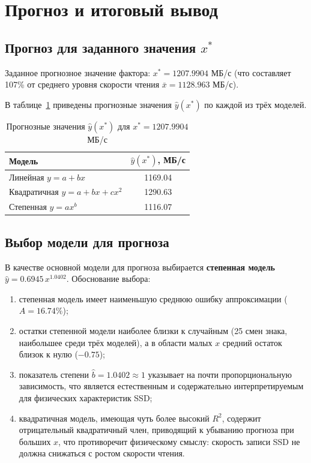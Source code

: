 \section{Прогноз и итоговый вывод}

\subsection{Прогноз для заданного значения \(x^*\)}

Заданное прогнозное значение фактора: \(x^* = 1207.9904\) МБ/с (что составляет 107\% от среднего уровня скорости чтения \(\bar{x} = 1128.963\) МБ/с).

В таблице~\ref{tab:prediction} приведены прогнозные значения \(\hat{y}(x^*)\) по каждой из трёх моделей.

\begin{table}[H]
\centering
\caption{Прогнозные значения \(\hat{y}(x^*)\) для \(x^* = 1207.9904\) МБ/с}
\label{tab:prediction}
\begin{tabular}{lc}
\toprule
Модель & \(\hat{y}(x^*)\), МБ/с \\
\midrule
Линейная \(y = a + bx\) & 1169.04 \\
Квадратичная \(y = a + bx + cx^2\) & 1290.63 \\
Степенная \(y = ax^b\) & 1116.07 \\
\bottomrule
\end{tabular}
\end{table}

\subsection{Выбор модели для прогноза}

В качестве основной модели для прогноза выбирается \textbf{степенная модель} \(\hat{y} = 0.6945 \, x^{1.0402}\). Обоснование выбора:

\begin{enumerate}
    \item степенная модель имеет наименьшую среднюю ошибку аппроксимации (\(A = 16.74\%\));
    \item остатки степенной модели наиболее близки к случайным (25 смен знака, наибольшее среди трёх моделей), а в области малых \(x\) средний остаток близок к нулю (\(-0.75\));
    \item показатель степени \(\hat{b} = 1.0402 \approx 1\) указывает на почти пропорциональную зависимость, что является естественным и содержательно интерпретируемым для физических характеристик SSD;
    \item квадратичная модель, имеющая чуть более высокий \(R^2\), содержит отрицательный квадратичный член, приводящий к убыванию прогноза при больших \(x\), что противоречит физическому смыслу: скорость записи SSD не должна снижаться с ростом скорости чтения.
\end{enumerate}

